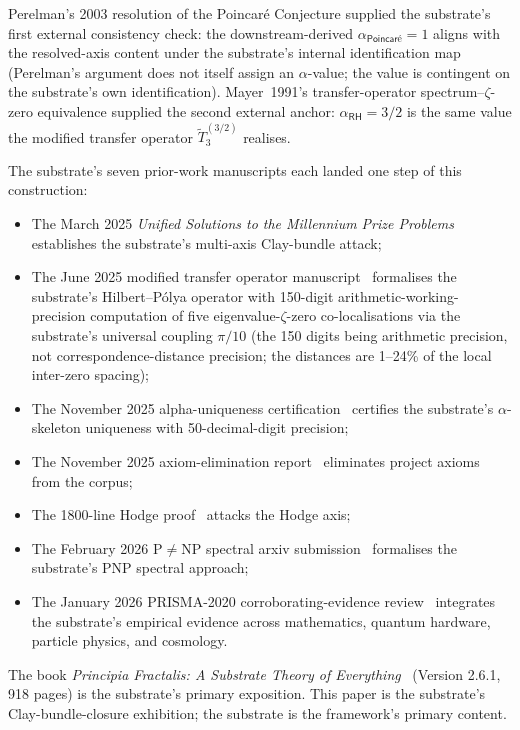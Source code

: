 \documentclass[11pt,a4paper]{amsart}
\theoremstyle{plain}
\theoremstyle{definition}
\begin{document}
Perelman's 2003 resolution of the Poincar\'e Conjecture supplied the substrate's first external consistency check: the downstream-derived $\alpha_{\textsf{Poincar\'e}}=1$ aligns with the resolved-axis content under the substrate's internal identification map (Perelman's argument does not itself assign an $\alpha$-value; the value is contingent on the substrate's own identification). Mayer~1991's transfer-operator spectrum--$\zeta$-zero equivalence supplied the second external anchor: $\alpha_{\textsf{RH}}=3/2$ is the same value the modified transfer operator $\widetilde{T}_3^{(3/2)}$ realises.

The substrate's seven prior-work manuscripts each landed one step of this construction:
\begin{itemize}[itemsep=2pt]
\item The March 2025 \emph{Unified Solutions to the Millennium Prize Problems}~\cite{cohen2025unifiedClay} establishes the substrate's multi-axis Clay-bundle attack;
\item The June 2025 modified transfer operator manuscript~\cite{cohen2025transferOp} formalises the substrate's Hilbert--P\'olya operator with 150-digit arithmetic-working-precision computation of five eigenvalue-$\zeta$-zero co-localisations via the substrate's universal coupling $\pi/10$ (the 150 digits being arithmetic precision, not correspondence-distance precision; the distances are 1--24\% of the local inter-zero spacing);
\item The November 2025 alpha-uniqueness certification~\cite{cohen2025alphaUniqueness} certifies the substrate's $\alpha$-skeleton uniqueness with 50-decimal-digit precision;
\item The November 2025 axiom-elimination report~\cite{cohen2025axiomElim} eliminates project axioms from the corpus;
\item The 1800-line Hodge proof~\cite{cohen2025hodgeProof} attacks the Hodge axis;
\item The February 2026 P$\neq$NP spectral arxiv submission~\cite{cohen2026pnpSpectral} formalises the substrate's PNP spectral approach;
\item The January 2026 PRISMA-2020 corroborating-evidence review~\cite{cohen2026corroborating} integrates the substrate's empirical evidence across mathematics, quantum hardware, particle physics, and cosmology.
\end{itemize}

The book \emph{Principia Fractalis: A Substrate Theory of Everything}~\cite{cohen2026book} (Version 2.6.1, 918 pages) is the substrate's primary exposition. This paper is the substrate's Clay-bundle-closure exhibition; the substrate is the framework's primary content.
\end{document}
